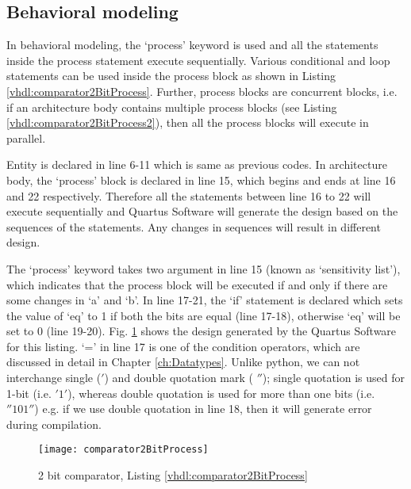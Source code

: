 \subsection{Behavioral modeling}\label{sec:behaviourModeling}
In behavioral modeling, the `process' keyword is used and all the statements inside the process statement execute sequentially. Various conditional and loop statements can be used inside the process block as shown in Listing \ref{vhdl:comparator2BitProcess}. Further, process blocks are concurrent blocks, i.e. if an architecture body contains multiple process blocks (see Listing \ref{vhdl:comparator2BitProcess2}), then all the process blocks will execute in parallel. 

\begin{explanation}
Entity is declared in line 6-11 which is same as previous codes. In architecture body, the `process' block is declared in line 15, which begins and ends at line 16 and 22 respectively. Therefore all the statements between line 16 to 22 will execute sequentially and Quartus Software will generate the design based on the sequences of the statements.  Any changes in sequences will result in different design.

The `process' keyword takes two argument in line 15 (known as `sensitivity list'), which indicates that the process block will be executed if and only if there are some changes in `a' and `b'. In line 17-21, the `if' statement is declared which sets the value of `eq' to 1 if both the bits are equal (line 17-18), otherwise `eq' will be set to 0 (line 19-20). Fig. \ref{fig:comparator2BitProcess} shows the design generated by the Quartus Software for this listing. `=' in line 17 is one of the condition operators, which are discussed in detail in Chapter \ref{ch:Datatypes}. Unlike python, we can not interchange single ($'$) and double quotation mark ( $''$); single quotation is used for 1-bit (i.e. $'1'$), whereas double quotation is used for more than one bits (i.e. $ ''101''$) e.g. if we use double quotation in line 18, then it will generate error during compilation.    
\end{explanation}

\begin{figure}
	\centering
	\texttt{[image: comparator2BitProcess]}
	\caption{2 bit comparator, Listing \ref{vhdl:comparator2BitProcess}}
	\label{fig:comparator2BitProcess}
\end{figure}



